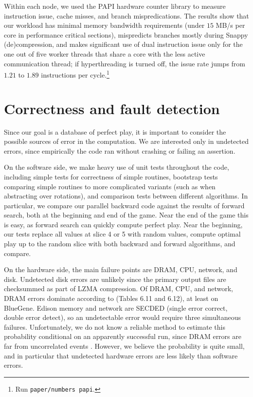 \documentclass[conference]{IEEEtran}
\begin{document}
Within each node, we used the PAPI hardware counter library \cite{mucci1999papi} to measure instruction issue,
cache misses, and branch mispredications.  The results show that our workload has minimal memory
bandwidth requirements (under $15$ MB/s per core in performance critical sections), mispredicts branches mostly
during Snappy (de)compression, and makes significant use of dual instruction issue only for the one out of five
worker threads that share a core with the less active communication thread; if hyperthreading is turned off, the
issue rate jumps from $1.21$ to $1.89$ instructions per cycle.\cprotect\footnote{Run \verb+paper/numbers papi+.}

\section{Correctness and fault detection}

Since our goal is a database of perfect play, it is important to consider the possible sources of error in the
computation.  We are interested only in undetected errors, since empirically the code ran
without crashing or failing an assertion.

On the software side, we make heavy use of unit tests throughout the code, including simple tests
for correctness of simple routines, bootstrap tests comparing simple routines to more complicated variants
(such as when abstracting over rotations), and comparison tests between different algorithms.
In particular, we compare our parallel backward code against the results of forward search, both at the
beginning and end of the game.  Near the end of the game this is easy, as forward search can quickly compute
perfect play.  Near the beginning, our tests replace all values at slice 4 or 5 with random values,
compute optimal play up to the random slice with both backward and forward algorithms, and compare.

On the hardware side, the main failure points are DRAM, CPU, network, and disk.  Undetected disk errors are unlikely
since the primary output files are checksummed as part of LZMA compression.  Of DRAM, CPU, and network, DRAM errors
dominate according to \cite{bergman2008exascale} (Tables 6.11 and 6.12), at least on BlueGene.  Edison memory
and network are SECDED (single error correct, double error detect), so an undetectable error would require three
simultaneous failures.  Unfortunately, we do not know a reliable method to estimate this probability conditional
on an apparently successful run, since DRAM errors are far from uncorrelated events \cite{schroeder2009dram}.
However, we believe the probability is quite small, and in particular that undetected hardware errors are less
likely than software errors.
\end{document}
